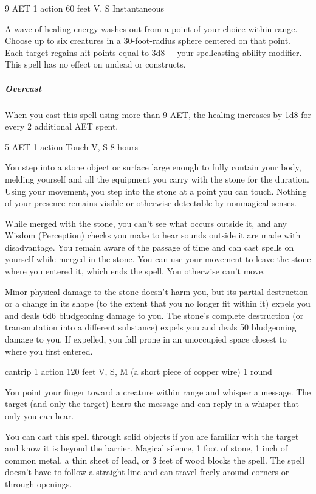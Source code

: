 \label{spell:mass-cure-wounds}
{9 AET}
{1 action}
{60 feet}
{V, S}
{Instantaneous}

A wave of healing energy washes out from a point of your choice within range. Choose up to six creatures in a 30-foot-radius sphere centered on that point. Each target regains hit points equal to 3d8 + your spellcasting ability modifier. This spell has no effect on undead or constructs.
\subparagraph*{Overcast} When you cast this spell using more than 9 AET, the healing increases by 1d8 for every 2 additional AET spent.

\label{spell:meld-into-stone}
{5 AET}
{1 action}
{Touch}
{V, S}
{8 hours}

You step into a stone object or surface large enough to fully contain your body, melding yourself and all the equipment you carry with the stone for the duration. Using your movement, you step into the stone at a point you can touch. Nothing of your presence remains visible or otherwise detectable by nonmagical senses.

While merged with the stone, you can't see what occurs outside it, and any Wisdom (Perception) checks you make to hear sounds outside it are made with disadvantage. You remain aware of the passage of time and can cast spells on yourself while merged in the stone. You can use your movement to leave the stone where you entered it, which ends the spell. You otherwise can't move.

Minor physical damage to the stone doesn't harm you, but its partial destruction or a change in its shape (to the extent that you no longer fit within it) expels you and deals 6d6 bludgeoning damage to you. The stone's complete destruction (or transmutation into a different substance) expels you and deals 50 bludgeoning damage to you. If expelled, you fall prone in an unoccupied space closest to where you first entered.

\label{spell:message}
{cantrip}
{1 action}
{120 feet}
{V, S, M (a short piece of copper wire)}
{1 round}

You point your finger toward a creature within range and whisper a message. The target (and only the target) hears the message and can reply in a whisper that only you can hear.

You can cast this spell through solid objects if you are familiar with the target and know it is beyond the barrier. Magical silence, 1 foot of stone, 1 inch of common metal, a thin sheet of lead, or 3 feet of wood blocks the spell. The spell doesn't have to follow a straight line and can travel freely around corners or through openings.

